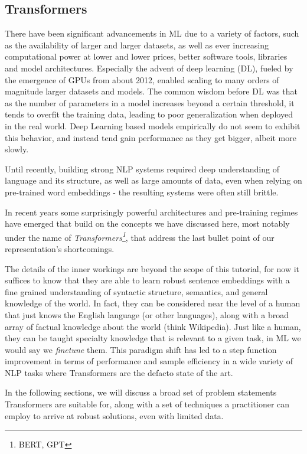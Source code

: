 \subsection{Transformers}
There have been significant advancements in ML due to a variety of factors, such as the availability of larger and larger datasets, as well as ever increasing computational power at lower and lower prices, better software tools, libraries and model architectures.
Especially the advent of deep learning (DL), fueled by the emergence of GPUs from about 2012, enabled scaling to many orders of magnitude larger datasets and models.
The common wisdom before DL was that as the number of parameters in a model increases beyond a certain threshold, it tends to overfit the training data, leading to poor generalization when deployed in the real world.
Deep Learning based models empirically do not seem to exhibit this behavior, and instead tend gain performance as they get bigger, albeit more slowly.

Until recently, building strong NLP systems required deep understanding of language and its structure, as well as large amounts of data, even when relying on pre-trained word embeddings - the resulting systems were often still brittle.

In recent years some surprisingly powerful architectures and pre-training regimes have emerged that build on the concepts we have discussed here, most notably under the name of \textit{Transformers\footnote{BERT, GPT}}, that address the last bullet point of our representation's shortcomings.

The details of the inner workings are beyond the scope of this tutorial, for now it suffices to know that they are able to learn robust sentence embeddings with a fine grained understanding of syntactic structure, semantics, and general knowledge of the world.
In fact, they can be considered near the level of a human that just knows the English language (or other languages), along with a broad array of factual knowledge about the world (think Wikipedia).
Just like a human, they can be taught specialty knowledge that is relevant to a given task, in ML we would say we \textit{finetune} them.
This paradigm shift has led to a step function improvement in terms of performance and sample efficiency in a wide variety of NLP tasks where Transformers are the defacto state of the art.

In the following sections, we will discuss a broad set of problem statements Transformers are suitable for, along with a set of techniques a practitioner can employ to arrive at robust solutions, even with limited data.

